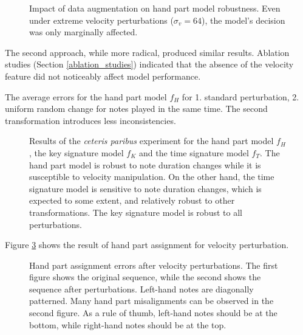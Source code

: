 \begin{figure}[ht!]
\centering  \caption[Impact of data augmentation on hand part model robustness.]{Impact of data augmentation on hand part model robustness. Even under extreme velocity perturbations ($\sigma_v = 64$), the model’s decision was only marginally affected.} \label{ceteris_paribus_h_augmentation} \end{figure}

The second approach, while more radical, produced similar results. Ablation studies (Section \ref{ablation_studies}) indicated that the absence of the velocity feature did not noticeably affect model performance.

\begin{table}[ht!]

\caption[The average errors for the hand part model.]{The average errors for the hand part model $f_H$ for 1. standard perturbation, 2. uniform random change for notes played in the same time. The second transformation introduces less inconsistencies.}
\label{hand_part_perturbations}
\end{table} 

\begin{figure}[ht!]
\centering



\caption[Results of the \emph{ceteris paribus} experiment.]{Results of the \emph{ceteris paribus} experiment for the hand part model $f_H$, the key signature model $f_K$ and the time signature model $f_T$. The hand part model is robust to note duration changes while it is susceptible to velocity manipulation. On the other hand, the time signature model is sensitive to note duration changes, which is expected to some extent, and relatively robust to other transformations. The key signature model is robust to all perturbations.}
\label{ceteris_paribus}
\end{figure}

Figure \ref{hand_part_misalignment} shows the result of hand part assignment for velocity perturbation.

\begin{figure}[!ht] \centering   \caption[Hand part assignment errors after velocity perturbations.]{Hand part assignment errors after velocity perturbations. The first figure shows the original sequence, while the second shows the sequence after perturbations. Left-hand notes are diagonally patterned. Many hand part misalignments can be observed in the second figure. As a rule of thumb, left-hand notes should be at the bottom, while right-hand notes should be at the top.} \label{hand_part_misalignment} \end{figure}

